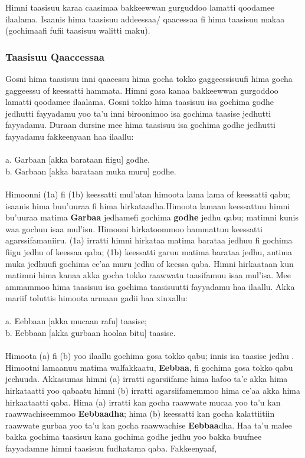 \documentclass[11pt,b5paper]{book}
\begin{document}
Himni taasisuu karaa caasimaa bakkeewwan gurguddoo lamatti qoodamee ilaalama. Isaanis hima taasisuu addeessaa/ qaacessaa fi hima taasisuu makaa (gochimaafi fufii taasisuu walitti maku). 

\subsubsection{Taasisuu Qaaccessaa}

Gosni hima taasisuu inni qaacessu hima gocha tokko gaggeessisuufi hima gocha gaggeessu of keessatti hammata. Himni gosa kanaa bakkeewwan gurgoddoo lamatti qoodamee ilaalama. Gosni tokko hima taasisuu isa gochima godhe jedhutti fayyadamu yoo ta’u inni biroonimoo isa gochima taasise jedhutti fayyadamu. Duraan dursine mee hima taasisuu isa gochima godhe jedhutti fayyadamu fakkeenyaan haa ilaallu: \\
\\
a. Garbaan [akka barataan fiigu] godhe.\\
b. Garbaan [akka barataan muka muru] godhe. \\
\\
Himoonni (1a) fi (1b) keessatti mul’atan himoota lama lama of keessatti qabu; isaanis hima buu’uuraa fi hima hirkataadha.Himoota lamaan keessattuu himni bu’uuraa matima \textbf{Garbaa} jedhamefi gochima \textbf{godhe} jedhu qabu; matimni kunis waa gochuu isaa mul’isu. Himooni hirkatoommoo hammattuu
keessatti agarssifamaniiru. (1a) irratti himni hirkataa matima barataa jedhuu fi gochima fiigu jedhu of keessaa qaba; (1b) keessatti garuu matima barataa jedhu, antima muka jedhuufi gochima ce’aa muru jedhu of keessa qaba. Himni hirkaataan kun matimni hima kanaa akka gocha tokko raawwatu taasifamuu isaa mul’isa. Mee ammammoo hima taasisuu isa gochima taasisuutti fayyadamu haa ilaallu. Akka mariif toluttis himoota armaan gadii haa xinxallu: \\
\\
a. Eebbaan [akka mucaan rafu] taasise; \\
b. Eebbaan [akka gurbaan hoolaa bitu] taasise.\\
\\
Himoota (a) fi (b) yoo ilaallu gochima gosa tokko qabu; innis isa taasise jedhu . Himootni lamaanuu matima walfakkaatu, \textbf{Eebbaa}, fi gochima gosa tokko qabu jechuuda. Akkasumas himni (a) irratti agarsiifame hima hafoo ta’e akka hima hirkataatti yoo qabaatu himni (b) irratti agarsiifamemmoo
hima ce’aa akka hima hirkaataatti qaba. Hima (a) irratti kan gocha raawwate mucaa yoo ta’u kan raawwachiseemmoo \textbf{Eebbaadha}; hima (b) keessatti kan gocha kalattiitiin raawwate gurbaa yoo ta’u kan gocha raawwachise \textbf{Eebbaa}dha. Haa ta’u malee bakka gochima taasisuu kana gochima godhe jedhu yoo bakka buufnee fayyadamne himni taasisuu fudhatama qaba. Fakkeenyaaf, \\
\end{document}
